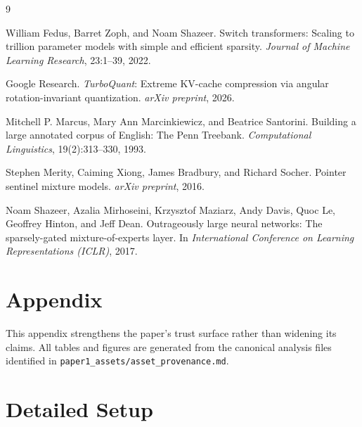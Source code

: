 \documentclass{article}
\begin{document}
\begin{thebibliography}{9}

William Fedus, Barret Zoph, and Noam Shazeer.
\newblock Switch transformers: Scaling to trillion parameter models with simple and efficient sparsity.
\newblock \emph{Journal of Machine Learning Research}, 23:1--39, 2022.

Google Research.
\newblock \emph{TurboQuant}: Extreme {KV}-cache compression via angular rotation-invariant quantization.
\newblock \emph{arXiv preprint}, 2026.

Mitchell P. Marcus, Mary Ann Marcinkiewicz, and Beatrice Santorini.
\newblock Building a large annotated corpus of {E}nglish: The {Penn Treebank}.
\newblock \emph{Computational Linguistics}, 19(2):313--330, 1993.

Stephen Merity, Caiming Xiong, James Bradbury, and Richard Socher.
\newblock Pointer sentinel mixture models.
\newblock \emph{arXiv preprint}, 2016.

Noam Shazeer, Azalia Mirhoseini, Krzysztof Maziarz, Andy Davis, Quoc Le, Geoffrey Hinton, and Jeff Dean.
\newblock Outrageously large neural networks: The sparsely-gated mixture-of-experts layer.
\newblock In \emph{International Conference on Learning Representations (ICLR)}, 2017.

\end{thebibliography}

\clearpage
\onecolumn
\appendix

\section{Appendix}
This appendix strengthens the paper's trust surface rather than widening its claims. All tables and figures are generated from the canonical analysis files identified in \texttt{paper1\_assets/asset\_provenance.md}.

\section{Detailed Setup}
\label{app:setup}
\begin{table}[H]
  \centering
  \caption{Exact LM setup values used in the canonical toy-language-model analyses.}
  \small
  
\end{table}
\end{document}

